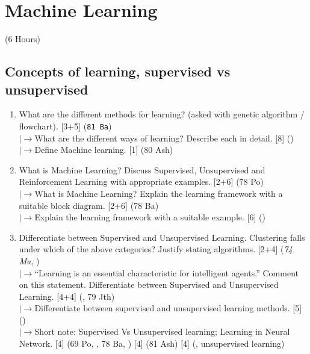 \documentclass[12pt]{article}
\newcommand{\lb}{\\$\left|\rightarrow\right.$}
\begin{document}
\pagebreak
\section{Machine Learning}
\begin{center}(6 Hours)\end{center}

  \subsection{Concepts of learning, supervised vs unsupervised}
    \begin{enumerate}[topsep=0pt, noitemsep]
      \item What are the different methods for learning? (asked with genetic algorithm / flowchart). \hfill [3+5] (\texttt{81 Ba})
        \lb What are the different ways of learning? Describe each in detail. \hfill [8] ()
        \lb Define Machine learning. \hfill [1] (80 Ash)

      \item What is Machine Learning? Discuss Supervised, Unsupervised and Reinforcement Learning with appropriate examples. \hfill [2+6] (78 Po)
        \lb What is Machine Learning? Explain the learning framework with a suitable block diagram. \hfill [2+6] (78 Ba)
        \lb Explain the learning framework with a suitable example. \hfill [6] ()

      \item Differentiate between Supervised and Unsupervised Learning. Clustering falls under which of the above categories? Justify stating algorithms. \hfill [2+4] (\textit{74 Ma}, )
        \lb ``Learning is an essential characteristic for intelligent agents.'' Comment on this statement. Differentiate between Supervised and Unsupervised Learning. \hfill [4+4] (, 79 Jth)
        \lb Differentiate between supervised and unsupervised learning methods. \hfill [5] ()
        \lb Short note: Supervised Vs Unsupervised learning; Learning in Neural Network. \hfill [4] (69 Po, , 78 Ba, ) [4] (81 Ash) [4] (, unsupervised learning)
    \end{enumerate}
\end{document}
